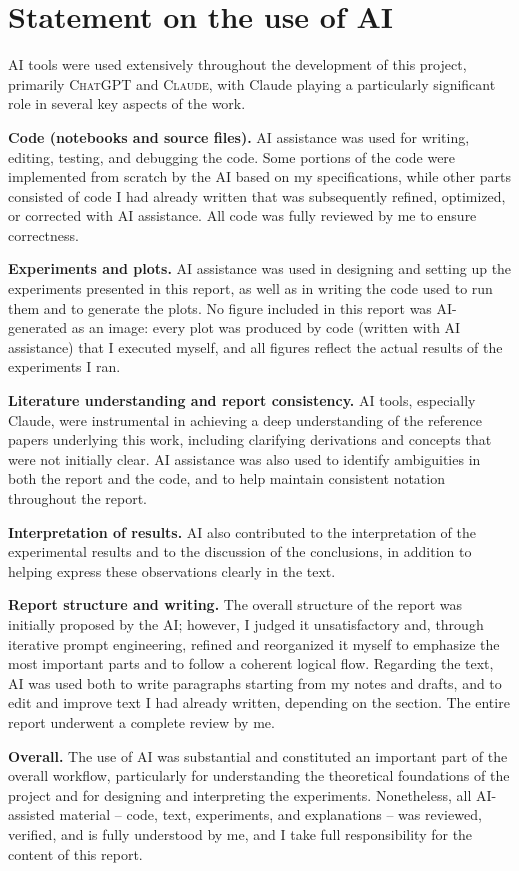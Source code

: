 
\section{Statement on the use of AI}\label{sec:ai}
%
AI tools were used extensively throughout the development of this project, primarily \textsc{ChatGPT} and \textsc{Claude}, 
with Claude playing a particularly significant role in several key aspects of the work.

\textbf{Code (notebooks and source files).} AI assistance was used for writing, editing, testing, and debugging the code. 
Some portions of the code were implemented from scratch by the AI based on my specifications, while other parts consisted 
of code I had already written that was subsequently refined, optimized, or corrected with AI assistance. All code was fully 
reviewed by me to ensure correctness.

\textbf{Experiments and plots.} AI assistance was used in designing and setting up the experiments presented in this report, 
as well as in writing the code used to run them and to generate the plots. No figure included in this report was AI-generated 
as an image: every plot was produced by code (written with AI assistance) that I executed myself, and all figures reflect the 
actual results of the experiments I ran.

\textbf{Literature understanding and report consistency.} AI tools, especially Claude, were instrumental in achieving a 
deep understanding of the reference papers underlying this work, including clarifying derivations and concepts that were 
not initially clear. AI assistance was also used to identify ambiguities in both the report and the code, and to help 
maintain consistent notation throughout the report.

\textbf{Interpretation of results.} AI also contributed to the interpretation of the experimental results and to the 
discussion of the conclusions, in addition to helping express these observations clearly in the text.

\textbf{Report structure and writing.} The overall structure of the report was initially proposed by the AI; however, 
I judged it unsatisfactory and, through iterative prompt engineering, refined and reorganized it myself to emphasize 
the most important parts and to follow a coherent logical flow. Regarding the text, AI was used both to write paragraphs 
starting from my notes and drafts, and to edit and improve text I had already written, depending on the section. 
The entire report underwent a complete review by me.

\textbf{Overall.} The use of AI was substantial and constituted an important part of the overall workflow, particularly 
for understanding the theoretical foundations of the project and for designing and interpreting the experiments. 
Nonetheless, all AI-assisted material -- code, text, experiments, and explanations -- was reviewed, verified, and 
is fully understood by me, and I take full responsibility for the content of this report.
